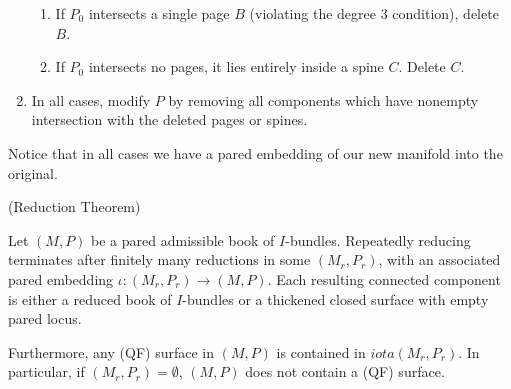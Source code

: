\begin{defn}
\begin{enumerate}
\begin{enumerate}
\item If $P_0$ intersects a single page $B$ (violating the degree 3 condition),
delete $B$.

\item If $P_0$ intersects no pages, it lies entirely inside a spine $C$. Delete
$C$.

\end{enumerate}

\item In all cases, modify $P$ by removing all components which have nonempty
intersection with the deleted pages or spines.

\end{enumerate}

\end{defn}

Notice that in all cases we have a pared embedding of our new manifold into the
original.

\begin{thm}(Reduction Theorem)

Let $(M,P)$ be a pared admissible book of $I$-bundles. Repeatedly reducing
terminates after finitely many reductions in some $(M_r,P_r)$, with an associated
pared embedding $\iota\colon (M_r,P_r) \to (M,P)$. Each resulting connected
component is either a reduced book of $I$-bundles or a thickened closed surface
with empty pared locus.

Furthermore, any (QF) surface in $(M,P)$ is contained in $iota(M_r,P_r)$. In
particular, if $(M_r,P_r)=\emptyset$, $(M,P)$ does not contain a (QF) surface.

\end{thm}

